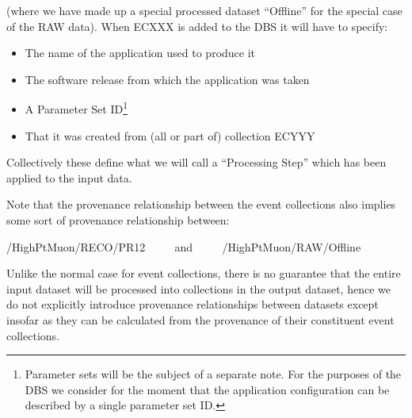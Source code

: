 \documentclass{cmspaper}
\begin{document}
(where we have made up a special processed dataset ``Offline'' for the
special case of the RAW data). When ECXXX is added to the DBS it will
have to specify:
\begin{itemize}
\item The name of the application used to produce it
\item The software release from which the application was taken
\item A Parameter Set ID\footnote{Parameter sets will be the subject of
a separate note. For the purposes of the DBS we consider for the moment
that the application configuration can be described by a single parameter
set ID.}
\item That it was created from (all or part of) collection ECYYY
\end{itemize}
Collectively these define what we will call a ``Processing Step'' which has
been applied to the input data.

  Note that the provenance relationship between the event collections also
implies some sort of provenance relationship between:

\begin{center}
/HighPtMuon/RECO/PR12 ~~~~ and ~~~~ /HighPtMuon/RAW/Offline
\end{center}
   
Unlike the normal case for event collections, there is no guarantee that 
the entire input dataset will be processed into collections in the output
dataset, hence we do not explicitly introduce provenance relationships between
datasets except insofar as they can be calculated from the provenance of
their constituent event collections.

%

\end{document}
